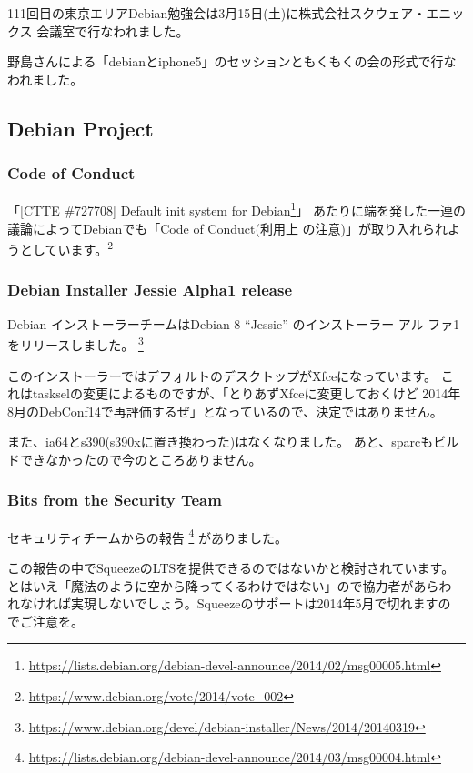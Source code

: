 \documentclass[mingoth,a4paper]{jsarticle}
\begin{document}
111回目の東京エリアDebian勉強会は3月15日(土)に株式会社スクウェア・エニッ
クス 会議室で行なわれました。

野島さんによる「debianとiphone5」のセッションともくもくの会の形式で行な
われました。

\subsection{Debian Project}

\subsubsection{Code of Conduct}
「[CTTE \#727708] Default init system for Debian\footnote{\url{https://lists.debian.org/debian-devel-announce/2014/02/msg00005.html}}」
あたりに端を発した一連の議論によってDebianでも「Code of Conduct(利用上
の注意)」が取り入れられようとしています。\footnote{\url{https://www.debian.org/vote/2014/vote_002}}

\subsubsection{Debian Installer Jessie Alpha1 release}

Debian インストーラーチームはDebian 8 ``Jessie'' のインストーラー アル
ファ1 をリリースしました。
\footnote{\url{https://www.debian.org/devel/debian-installer/News/2014/20140319}}

このインストーラーではデフォルトのデスクトップがXfceになっています。
これはtaskselの変更によるものですが、「とりあずXfceに変更しておくけど
2014年8月のDebConf14で再評価するぜ」となっているので、決定ではありません。

また、ia64とs390(s390xに置き換わった)はなくなりました。
あと、sparcもビルドできなかったので今のところありません。

\subsubsection{Bits from the Security Team}

セキュリティチームからの報告
\footnote{\url{https://lists.debian.org/debian-devel-announce/2014/03/msg00004.html}}
がありました。

この報告の中でSqueezeのLTSを提供できるのではないかと検討されています。
とはいえ「魔法のように空から降ってくるわけではない」ので協力者があらわ
れなければ実現しないでしょう。Squeezeのサポートは2014年5月で切れますの
でご注意を。
\end{document}
